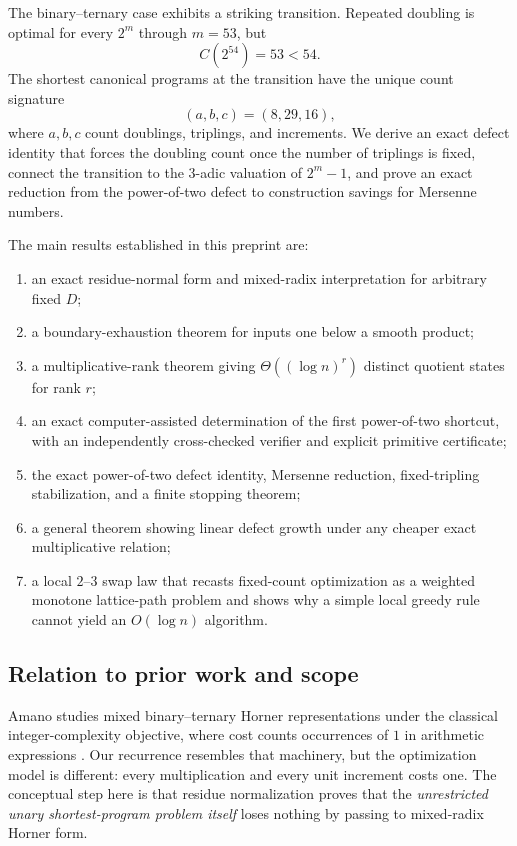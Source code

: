 \documentclass[11pt]{article}
\begin{document}
The binary--ternary case exhibits a striking transition. Repeated doubling is optimal for every $2^m$ through $m=53$, but
\[
 C(2^{54})=53<54.
\]
The shortest canonical programs at the transition have the unique count signature
\[
 (a,b,c)=(8,29,16),
\]
where $a,b,c$ count doublings, triplings, and increments. We derive an exact defect identity that forces the doubling count once the number of triplings is fixed, connect the transition to the $3$-adic valuation of $2^m-1$, and prove an exact reduction from the power-of-two defect to construction savings for Mersenne numbers.

The main results established in this preprint are:
\begin{enumerate}[label=(\roman*)]
\item an exact residue-normal form and mixed-radix interpretation for arbitrary fixed $D$;
\item a boundary-exhaustion theorem for inputs one below a smooth product;
\item a multiplicative-rank theorem giving $\Theta((\log n)^r)$ distinct quotient states for rank $r$;
\item an exact computer-assisted determination of the first power-of-two shortcut, with an independently cross-checked verifier and explicit primitive certificate;
\item the exact power-of-two defect identity, Mersenne reduction, fixed-tripling stabilization, and a finite stopping theorem;
\item a general theorem showing linear defect growth under any cheaper exact multiplicative relation;
\item a local $2$--$3$ swap law that recasts fixed-count optimization as a weighted monotone lattice-path problem and shows why a simple local greedy rule cannot yield an $O(\log n)$ algorithm.
\end{enumerate}

\subsection*{Relation to prior work and scope}
Amano studies mixed binary--ternary Horner representations under the classical integer-complexity objective, where cost counts occurrences of $1$ in arithmetic expressions \cite{Amano2022}. Our recurrence resembles that machinery, but the optimization model is different: every multiplication and every unit increment costs one. The conceptual step here is that residue normalization proves that the \emph{unrestricted unary shortest-program problem itself} loses nothing by passing to mixed-radix Horner form.
\end{document}
